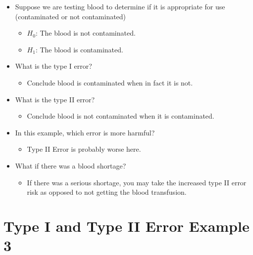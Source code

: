 \documentclass[12pt]{article}
\begin{document}
\begin{itemize}
\itemsep1pt\parskip0pt
\item
  Suppose we are testing blood to determine if it is appropriate for use
  (contaminated or not contaminated)

  \begin{itemize}
  \itemsep1pt\parskip0pt
  \item
    \(H_{0}\): The blood is not contaminated.
  \item
    \(H_{1}\): The blood is contaminated.
  \end{itemize}
\item
  What is the type I error?

  \begin{itemize}
  \itemsep1pt\parskip0pt
  \item
    Conclude blood is contaminated when in fact it is not.
  \end{itemize}
\item
  What is the type II error?

  \begin{itemize}
  \itemsep1pt\parskip0pt
  \item
    Conclude blood is not contaminated when it is contaminated.
  \end{itemize}
\item
  In this example, which error is more harmful?

  \begin{itemize}
  \itemsep1pt\parskip0pt
  \item
    Type II Error is probably worse here.
  \end{itemize}
\item
  What if there was a blood shortage?

  \begin{itemize}
  \itemsep1pt\parskip0pt
  \item
    If there was a serious shortage, you may take the increased type II
    error risk as opposed to not getting the blood transfusion.
  \end{itemize}
\end{itemize}

\section{Type I and Type II Error Example
3}\label{type-i-and-type-ii-error-example-3}
\end{document}
